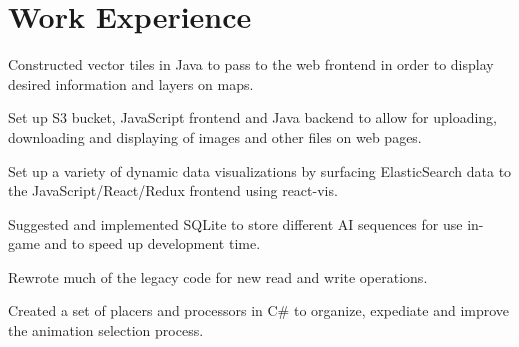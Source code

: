 \documentclass[letterpaper]{deedy-resume-modified} %
\begin{document}
\hfill
%
%
\begin{minipage}[t]{0.70\textwidth} %
\vspace{5pt}

\section{Work Experience}


\vspace{\topsep}
\begin{tightitemize}
\item Constructed vector tiles in Java to pass to the web frontend in order to display desired information and layers on maps.
\item Set up S3 bucket, JavaScript frontend and Java backend to allow for uploading, downloading and displaying of images and other files on web pages.
\item Set up a variety of dynamic data visualizations by surfacing ElasticSearch data to the JavaScript/React/Redux frontend using react-vis.
\end{tightitemize}

\sectionspace %

\vspace{\topsep}
\begin{tightitemize}
\vspace{-10pt}
\item Suggested and implemented SQLite to store different AI sequences for use in-game and to speed up development time.  
\item Rewrote much of the legacy \CPP \hspace{1pt}code for new read and write operations.
\item Created a set of placers and processors in C\# to organize, expediate and improve the animation selection process.
\end{tightitemize}


\end{minipage}
\end{document}
